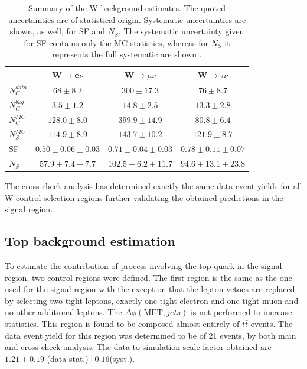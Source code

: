 \begin{table}[!htb]
\centering
\begin{tabular}{|l|c|c|c|}
\hline
 & W$\rightarrow$e$\nu$ & W$\rightarrow\mu\nu$ & W$\rightarrow\tau\nu$ \\
\hline\hline
$N_{C}^{data}$ &    $68\pm8.2$ &   $300\pm17.3$ &    $76\pm8.7$ \\
$N_{C}^{bkg}$  &   $3.5\pm1.2$ &  $14.8\pm2.5$  &  $13.3\pm2.8$ \\
$N_{C}^{MC}$   & $128.0\pm8.0$ & $399.9\pm14.9$ &  $80.8\pm6.4$ \\
$N_{S}^{MC}$   & $114.9\pm8.9$ & $143.7\pm10.2$ & $121.9\pm8.7$ \\
\hline\hline
SF             & $0.50\pm0.06\pm0.03$ & $0.71\pm0.04\pm0.03$ & $0.78\pm0.11\pm0.07$ \\
\hline\hline
$N_{S}$        & $57.9\pm7.4\pm7.7$ & $102.5\pm6.2\pm11.7$ & $94.6\pm13.1\pm23.8$ \\
\hline
\end{tabular}
\caption{Summary of the W background estimates. The quoted uncertainties are of statistical origin. Systematic uncertainties are shown, as well, for SF and $N_S$. The systematic uncertainty given for SF contains only the \gls{MC} statistics, whereas for $N_{S}$ it represents the full systematic are shown \cite{ARTICLE:CMSVBFHiggsInvisibleParkedAnalysisPAS}.}
\label{TABLE:ParkedDataAnalysis_WBackground_Summary}
\end{table}

The cross check analysis has determined exactly the same data event yields for all W control selection regions further validating the obtained predictions in the signal region.

\subsection{Top background estimation}
\label{SECTION:ParkedDataAnalysis_ControlRegions_TopBackground}


To estimate the contribution of process involving the top quark in the signal region, two control regions were defined. The first region is the same as the one used for the signal region with the exception that the lepton vetoes are replaced by selecting two tight leptons, exactly one tight electron and one tight muon and no other additional leptons. The $\Delta\phi(\text{MET},jets)$ is not performed to increase statistics.  This region is found to be composed almost entirely of $t\bar{t}$ events. The data event yield for this region was determined to be of 21 events, by both main and cross check analysis. The data-to-simulation scale factor obtained are $1.21\pm 0.19$ (data stat.)$ \pm 0.16 $(syst.). 

